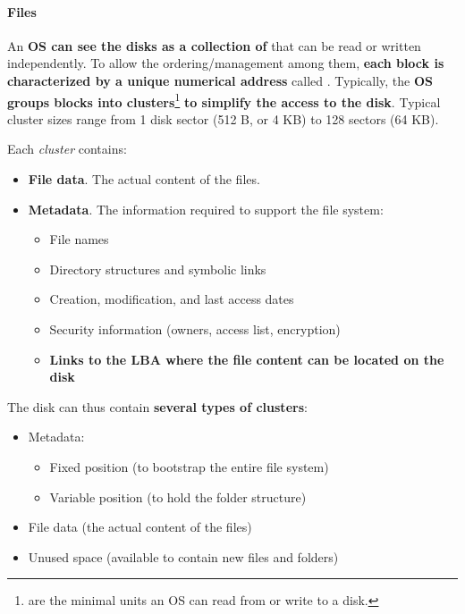 \newpage

\paragraph{Files}

An \textbf{OS can see the disks as a collection of}  that can be read or written independently. To allow the ordering/management among them, \textbf{each block is characterized by a unique numerical address} called . Typically, the \textbf{OS groups blocks into clusters}\footnote{ are the minimal units an OS can read from or write to a disk.} \textbf{to simplify the access to the disk}. Typical cluster sizes range from 1 disk sector (512 B, or 4 KB) to 128 sectors (64 KB).

\highspace
Each \emph{cluster} contains:
\begin{itemize}
    \item \textbf{File data}. The actual content of the files.
    
    \item \textbf{Metadata}. The information required to support the file system:
    \begin{itemize}
        \item File names
        \item Directory structures and symbolic links
        \item Creation, modification, and last access dates
        \item Security information (owners, access list, encryption)
        \item \textbf{Links to the LBA where the file content can be located on the disk}
    \end{itemize}
\end{itemize}
The disk can thus contain \textbf{several types of clusters}:
\begin{itemize}
    \item Metadata:
    \begin{itemize}
        \item Fixed position (to bootstrap the entire file system)
        \item Variable position (to hold the folder structure)
    \end{itemize}
    
    \item File data (the actual content of the files)
    
    \item Unused space (available to contain new files and folders)
\end{itemize}

